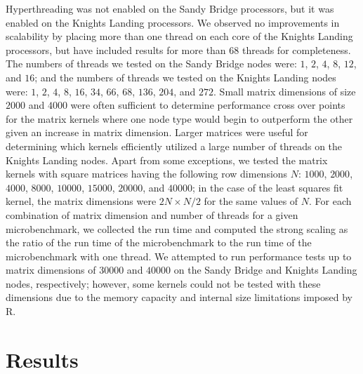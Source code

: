 Hyperthreading was not enabled on the Sandy Bridge processors, but it was
  enabled on the Knights Landing processors.
We observed no improvements in scalability by placing more than one thread on
  each core of the Knights Landing processors, but have included results for
  more than 68 threads for completeness.
The numbers of threads we tested on the Sandy Bridge nodes were:
  $1$, $2$, $4$, $8$, $12$, and $16$; and the numbers of threads we tested on
  the Knights Landing nodes were:
  $1$, $2$, $4$, $8$, $16$, $34$, $66$, $68$, $136$, $204$, and $272$.
Small matrix dimensions of size $2000$ and $4000$ were often sufficient to
  determine performance cross over points for the matrix kernels where one
  node type would begin to outperform the other given an increase in matrix
  dimension.
Larger matrices were useful for determining which kernels efficiently utilized a
  large number of threads on the Knights Landing nodes.
Apart from some exceptions, we tested the matrix kernels with
  square matrices having the following row dimensions $N$:
  $1000$, $2000$, $4000$, $8000$, $10000$, $15000$, $20000$, and $40000$; in the
  case of the least squares fit kernel, the matrix dimensions were
  $2N \times N/2$ for the same values of $N$.
For each combination of matrix dimension and number of threads for a given
  microbenchmark, we collected the run time and computed the strong scaling as
  the ratio of the run time of the microbenchmark to the run time of the
  microbenchmark with one thread.
We attempted to run performance tests up to matrix dimensions of $30000$ and
  $40000$ on the Sandy Bridge and Knights Landing nodes, respectively; however,
  some kernels could not be tested with these dimensions due to the memory
  capacity and internal size limitations imposed by R.






\section{Results} \label{sec:results}
%

